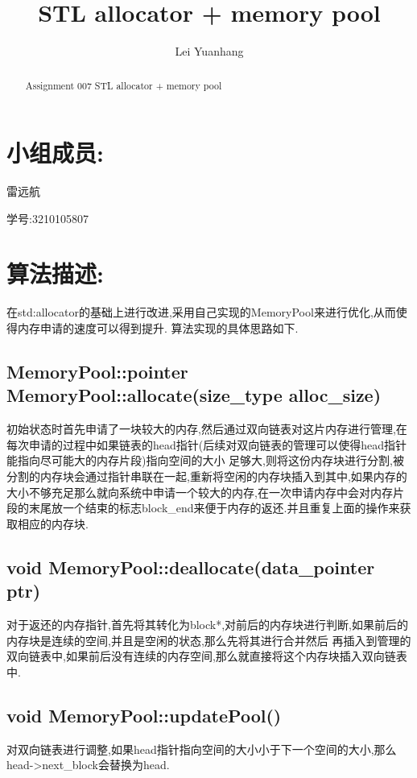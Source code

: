 \documentclass{article}
\title{STL allocator + memory pool}
\author{Lei Yuanhang}
\begin{document}
\maketitle

\begin{abstract}
Assignment 007 STL allocator + memory pool


\end{abstract}

\section*{小组成员:}
雷远航 

学号:3210105807

\section*{算法描述:}
在std:allocator的基础上进行改进,采用自己实现的MemoryPool来进行优化,从而使得内存申请的速度可以得到提升.
算法实现的具体思路如下.
\subsection*{MemoryPool::pointer MemoryPool::allocate(size\_type alloc\_size)}
初始状态时首先申请了一块较大的内存,然后通过双向链表对这片内存进行管理,在每次申请的过程中如果链表的head指针(后续对双向链表的管理可以使得head指针能指向尽可能大的内存片段)指向空间的大小
足够大,则将这份内存块进行分割,被分割的内存块会通过指针串联在一起,重新将空闲的内存块插入到其中,如果内存的大小不够充足那么就向系统中申请一个较大的内存,在一次申请内存中会对内存片段的末尾放一个结束的标志block\_end来便于内存的返还.并且重复上面的操作来获取相应的内存块.

\subsection*{void MemoryPool::deallocate(data\_pointer ptr) }
对于返还的内存指针,首先将其转化为block*,对前后的内存块进行判断,如果前后的内存块是连续的空间,并且是空闲的状态,那么先将其进行合并然后
再插入到管理的双向链表中,如果前后没有连续的内存空间,那么就直接将这个内存块插入双向链表中.

\subsection*{void MemoryPool::updatePool() }
对双向链表进行调整,如果head指针指向空间的大小小于下一个空间的大小,那么head->next\_block会替换为head.
\end{document}
